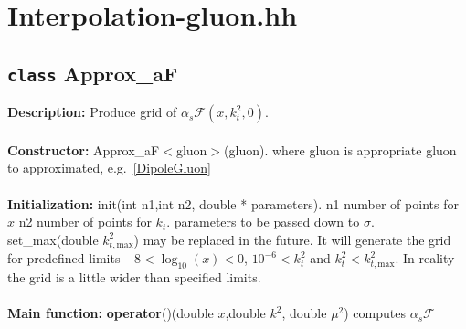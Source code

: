 \documentclass[12pt]{article}
\newenvironment{entry}[1]{\textbf{\large #1:  }}{\\\vspace{3mm}\\}
\begin{document}
\section{Interpolation-gluon.hh}
\subsection{\texttt{class} Approx\_aF}
\begin{entry}{Description}
	Produce grid of $\alpha_s\mathcal{F}(x,k_t^2,0)$.
\end{entry}
\begin{entry}{Constructor}
	Approx\_aF$<$gluon$>$(gluon). where gluon is appropriate gluon to approximated, e.g.~\ref{DipoleGluon}
\end{entry}
\begin{entry}{Initialization}
	init(int n1,int n2, double * parameters).
	n1 number of points for $x$
	n2 number of points for $k_t$.
	parameters to be passed down to $\sigma$.\\
	set\_max(double $k^2_{t,\mathrm{max}}$)	may be replaced in the future. 
	It will generate the grid for predefined limits $-8<\log_{10}(x)<0$, $10^{-6}<k_t^2$ and $k_t^2< k^2_{t,\mathrm{max}}$. 
	In reality the grid is a little wider than specified limits.
\end{entry}
\begin{entry}{Main function}
	\textbf{operator}()(double $x$,double $k^2$, double $\mu^2$)
	computes $\alpha_s\mathcal{F}$
\end{entry}
\end{document}
